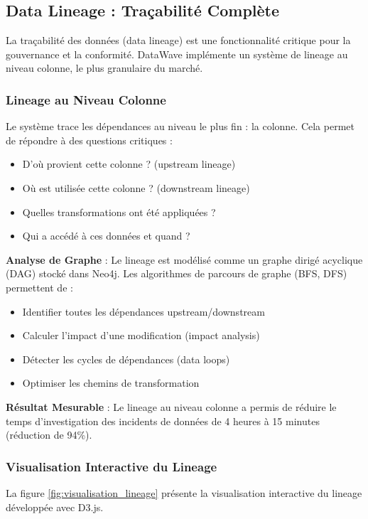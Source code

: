 \subsection{Data Lineage : Traçabilité Complète}

La traçabilité des données (data lineage) est une fonctionnalité critique pour la gouvernance et la conformité. DataWave implémente un système de lineage au niveau colonne, le plus granulaire du marché.

\subsubsection{Lineage au Niveau Colonne}

Le système trace les dépendances au niveau le plus fin : la colonne. Cela permet de répondre à des questions critiques :
\begin{itemize}
    \item D'où provient cette colonne ? (upstream lineage)
    \item Où est utilisée cette colonne ? (downstream lineage)
    \item Quelles transformations ont été appliquées ?
    \item Qui a accédé à ces données et quand ?
\end{itemize}

\textbf{Analyse de Graphe} : Le lineage est modélisé comme un graphe dirigé acyclique (DAG) stocké dans Neo4j. Les algorithmes de parcours de graphe (BFS, DFS) permettent de :
\begin{itemize}
    \item Identifier toutes les dépendances upstream/downstream
    \item Calculer l'impact d'une modification (impact analysis)
    \item Détecter les cycles de dépendances (data loops)
    \item Optimiser les chemins de transformation
\end{itemize}

\textbf{Résultat Mesurable} : Le lineage au niveau colonne a permis de réduire le temps d'investigation des incidents de données de 4 heures à 15 minutes (réduction de 94\%).

\subsubsection{Visualisation Interactive du Lineage}

La figure \ref{fig:visualisation_lineage} présente la visualisation interactive du lineage développée avec D3.js.

